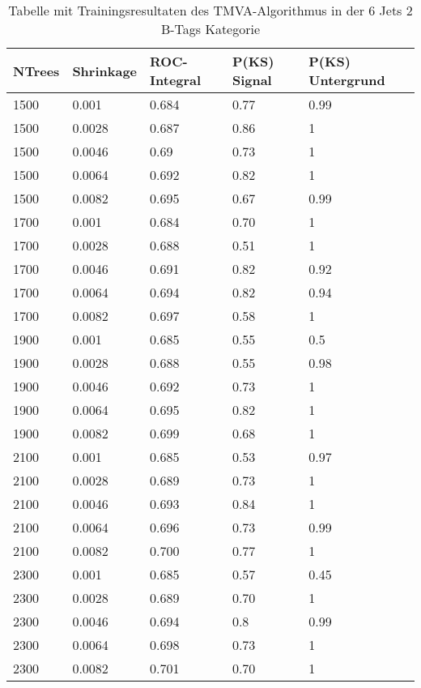 \begin{table}[tbp]\parbox{12cm}{
  \caption[TMVA 6j2t Ergebnisse]{Tabelle mit Trainingsresultaten des TMVA-Algorithmus in der 6 Jets 2 B-Tags Kategorie}%
  }\label{tab:tmva_6j2t}
  \begin{center}
  \begin{tabular}{lllll}
  \hline
  NTrees & Shrinkage & ROC-Integral & P(KS) Signal & P(KS) Untergrund\\
  \hline
\num{1500} & \num{0.001}  & \num{0,684} & \num{0,77} & \num{0,99}\\
\num{1500} & \num{0.0028} & \num{0,687} & \num{0,86} & \num{1}\\
\num{1500} & \num{0.0046} & \num{0,69}  & \num{0,73} & \num{1}\\
\num{1500} & \num{0.0064} & \num{0,692} & \num{0,82} & \num{1}\\
\num{1500} & \num{0.0082} & \num{0,695} & \num{0,67} & \num{0,99}\\
\num{1700} & \num{0.001}  & \num{0,684} & \num{0,70} & \num{1}\\
\num{1700} & \num{0.0028} & \num{0,688} & \num{0,51} & \num{1}\\
\num{1700} & \num{0.0046} & \num{0,691} & \num{0,82} & \num{0,92}\\
\num{1700} & \num{0.0064} & \num{0,694} & \num{0,82} & \num{0,94}\\
\num{1700} & \num{0.0082} & \num{0,697} & \num{0,58} & \num{1}\\
\num{1900} & \num{0.001}  & \num{0,685} & \num{0,55} & \num{0,5}\\
\num{1900} & \num{0.0028} & \num{0,688} & \num{0,55} & \num{0,98}\\
\num{1900} & \num{0.0046} & \num{0,692} & \num{0,73} & \num{1}\\
\num{1900} & \num{0.0064} & \num{0,695} & \num{0,82} & \num{1}\\
\num{1900} & \num{0.0082} & \num{0,699} & \num{0,68} & \num{1}\\
\num{2100} & \num{0.001}  & \num{0,685} & \num{0,53} & \num{0,97}\\
\num{2100} & \num{0.0028} & \num{0,689} & \num{0,73} & \num{1}\\
\num{2100} & \num{0.0046} & \num{0,693} & \num{0,84} & \num{1}\\
\num{2100} & \num{0.0064} & \num{0,696} & \num{0,73} & \num{0,99}\\
\num{2100} & \num{0.0082} & \num{0,700} & \num{0,77} & \num{1}\\
\num{2300} & \num{0.001}  & \num{0,685} & \num{0,57} & \num{0,45}\\
\num{2300} & \num{0.0028} & \num{0,689} & \num{0,70} & \num{1}\\
\num{2300} & \num{0.0046} & \num{0,694} & \num{0,8}  & \num{0,99}\\
\num{2300} & \num{0.0064} & \num{0,698} & \num{0,73} & \num{1}\\
\num{2300} & \num{0.0082} & \num{0,701} & \num{0,70} & \num{1}\\
  \hline
  \end{tabular}
  \end{center}
\end{table}

